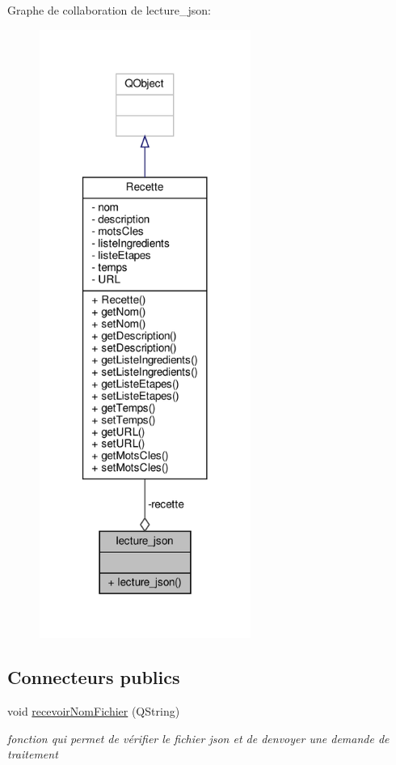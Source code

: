 Graphe de collaboration de lecture\+\_\+json\+:\nopagebreak
\begin{figure}[H]
\begin{center}
\leavevmode
\includegraphics[width=196pt]{classlecture__json__coll__graph}
\end{center}
\end{figure}
\subsection*{Connecteurs publics}
\begin{DoxyCompactItemize}
\item 
void \hyperlink{classlecture__json_a9b907076c0d37125a6ab35b5906c9880}{recevoir\+Nom\+Fichier} (Q\+String)
\begin{DoxyCompactList}\small\item\em fonction qui permet de vérifier le fichier json et de d\textquotesingle{}envoyer une demande de traitement \end{DoxyCompactList}\end{DoxyCompactItemize}

